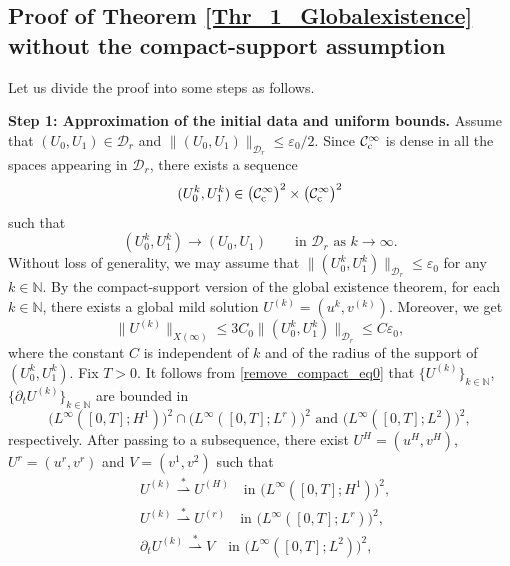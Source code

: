 \documentclass[11pt,reqno]{amsart}
\newcommand{\ity}{\infty}
\begin{document}
	\subsection{Proof of Theorem \ref{Thr_1_Globalexistence} without the compact-support assumption}
	Let us divide the proof into some steps as follows.\medskip
	
	\noindent
	\textbf{Step 1: Approximation of the initial data and uniform bounds.}
	Assume that $(U_0,U_1)\in\mathcal D_r$ and $ \|(U_0,U_1)\|_{\mathcal D_r}\leq\varepsilon_0/2$. Since $\mathcal{C}^\infty_{\rm c}$ is dense in all the spaces appearing in $\mathcal D_r$, there exists a sequence
	\[
	(U_0^k,U_1^k)\in\bigl(\mathcal{C}^\infty_{\rm c}\bigr)^2\times\bigl(\mathcal{C}^\infty_{\rm c}\bigr)^2
	\]
	such that
	\begin{equation}\label{converge_initialdata}
		(U_0^k,U_1^k)\to (U_0,U_1)\qquad\text{in }\mathcal D_r \text{ as }k\to \ity.
	\end{equation}
	Without loss of generality, we may assume that $\|(U_0^k,U_1^k)\|_{\mathcal D_r}\leq\varepsilon_{0}$ for any $k\in\mathbb N$. By the compact-support version of the global existence theorem, for each $k\in\mathbb N$, there exists a global mild solution $U^{(k)}=(u^k,v^{(k)})$. Moreover, we get
	\begin{equation}\label{remove_compact_eq0}
		\|U^{(k)}\|_{X(\infty)}\leq 3C_0\|(U_0^k,U_1^k)\|_{\mathcal D_r}\leq C\varepsilon_{0},
	\end{equation}
	where the constant $C$ is independent of $k$ and of the radius of the support of $(U_0^k,U_1^k)$. Fix $T>0$. It follows from \eqref{remove_compact_eq0} that $\{U^{(k)}\}_{k\in\mathbb N}$, $\{\partial_tU^{(k)}\}_{k\in\mathbb N}$ are bounded in
	$$\bigl(L^\infty([0,T];H^1)\bigr)^2 \cap \bigl(L^\infty([0,T];L^r)\bigr)^2 \text{ and }\bigl(L^\infty([0,T];L^2)\bigr)^2, $$
	respectively. After passing to a subsequence, there exist $U^{H}=(u^H,v^H)$, $U^{r}=(u^r,v^r)$ and $V=(v^1,v^2)$ such that
	\begin{align}
		&U^{(k)}\stackrel{*}{\rightharpoonup} U^{(H)}\quad\text{in }\bigl(L^\infty([0,T];H^1)\bigr)^2 ,\label{remove_compact_eq1}\\
		&U^{(k)}\stackrel{*}{\rightharpoonup}U^{(r)}\quad\text{in }\bigl(L^\infty([0,T];L^r)\bigr)^2 ,\label{remove_compact_eq2}\\
		&\partial_tU^{(k)}\stackrel{*}{\rightharpoonup} V\quad\text{in }\bigl(L^\infty([0,T];L^2)\bigr)^2, \label{remove_compact_eq3}
	\end{align}
\end{document}
